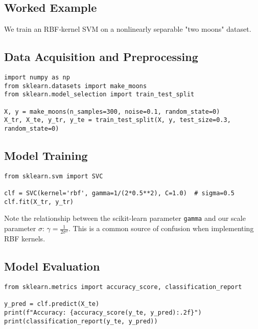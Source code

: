 \documentclass[11pt]{article}
\newenvironment{insight}
  {\begin{tcolorbox}[colback=blue!5!white,colframe=blue!75!black,title=Key Insight]}
  {\end{tcolorbox}}
\begin{document}
\subsection{Worked Example}
We train an RBF‐kernel SVM on a nonlinearly separable "two moons" dataset.

\subsection{Data Acquisition and Preprocessing}
\begin{lstlisting}
import numpy as np
from sklearn.datasets import make_moons
from sklearn.model_selection import train_test_split

X, y = make_moons(n_samples=300, noise=0.1, random_state=0)
X_tr, X_te, y_tr, y_te = train_test_split(X, y, test_size=0.3, random_state=0)
\end{lstlisting}

\subsection{Model Training}
\begin{lstlisting}
from sklearn.svm import SVC

clf = SVC(kernel='rbf', gamma=1/(2*0.5**2), C=1.0)  # sigma=0.5
clf.fit(X_tr, y_tr)
\end{lstlisting}

\begin{insight}
Note the relationship between the scikit-learn parameter \texttt{gamma} and our scale parameter $\sigma$: $\gamma = \frac{1}{2\sigma^2}$. This is a common source of confusion when implementing RBF kernels.
\end{insight}

\subsection{Model Evaluation}
\begin{lstlisting}
from sklearn.metrics import accuracy_score, classification_report

y_pred = clf.predict(X_te)
print(f"Accuracy: {accuracy_score(y_te, y_pred):.2f}")
print(classification_report(y_te, y_pred))
\end{lstlisting}
\end{document}
